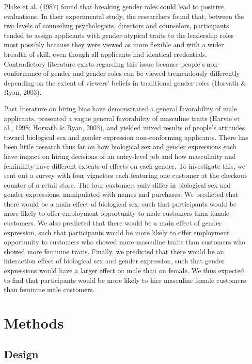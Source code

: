 \documentclass[english,man]{apa6}
\theoremstyle{definition}
\theoremstyle{definition}
\theoremstyle{remark}
\begin{document}
Plake et al. (1987) found that breaking gender roles could lead to
positive evaluations. In their experimental study, the researchers found
that, between the two levels of counseling psychologists, directors and
counselors, participants tended to assign applicants with
gender-atypical traits to the leadership roles most possibly because
they were viewed as more flexible and with a wider breadth of skill,
even though all applicants had identical credentials. Contradictory
literature exists regarding this issue because people's non-conformance
of gender and gender roles can be viewed tremendously differently
depending on the extent of viewers' beliefs in traditional gender roles
(Horvath \& Ryan, 2003).

Past literature on hiring bias have demonstrated a general favorability
of male applicants, presented a vague general favorability of masculine
traits (Harvie et al., 1998; Horvath \& Ryan, 2003), and yielded mixed
results of people's attitudes toward biological sex and gender
expression non-conforming applicants. There has been little research
thus far on how biological sex and gender expressions each have impact
on hiring decisions of an entry-level job and how masculinity and
femininity have different extents of effects on each gender. To
investigate this, we sent out a survey with four vignettes each
featuring one customer at the checkout counter of a retail store. The
four customers only differ in biological sex and gender expressions,
manipulated with names and purchases. We predicted that there would be a
main effect of biological sex, such that participants would be more
likely to offer employment opportunity to male customers than female
customers. We also predicted that there would be a main effect of gender
expression, such that participants would be more likely to offer
employment opportunity to customers who showed more masculine traits
than customers who showed more feminine traits. Finally, we predicted
that there would be an interaction effect of biological sex and gender
expression, such that gender expressions would have a larger effect on
male than on female. We thus expected to find that participants would be
more likely to hire masculine female customers than feminine male
customers.

\section{Methods}\label{methods}

\subsection{Design}\label{design}
\end{document}
